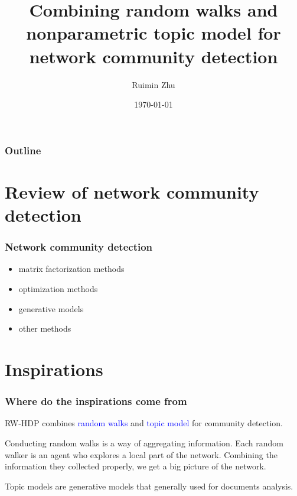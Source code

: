 \documentclass{beamer}
\title[RW-HDP]{Combining random walks and nonparametric topic model for network community detection} %
\author{Ruimin Zhu} %
\institute[Department of Statistics] %
{
Northwestern University \\ %
\medskip
\textit{ruiminzhu2014@u.northwestern.edu} %
}
\date{\today} %
\begin{document}
\begin{frame}
\titlepage %
\end{frame}

\begin{frame}
\frametitle{Outline} %
\tableofcontents %
\end{frame}


\section{Review of network community detection}
\begin{frame}
\frametitle{Network community detection}
\begin{itemize}
	\item matrix factorization methods
	\item optimization methods
	\item generative models
	\item other methods
\end{itemize}
\end{frame}

\section{Inspirations}
\begin{frame}
\frametitle{Where do the inspirations come from}
RW-HDP combines \textcolor{blue}{random walks} and \textcolor{blue}{topic model} for community detection.\\
\vspace{3mm}

Conducting random walks is a way of aggregating information. Each random walker is an agent who explores a local part of the network. Combining the information they collected properly, we get a big picture of the network.\\
\vspace{3mm}

Topic models are generative models that generally used for documents analysis.
\end{frame}
\end{document}
